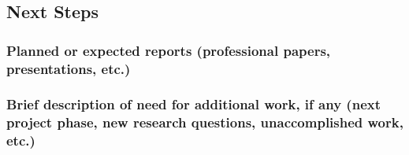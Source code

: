 \documentclass[letterpaper,12pt]{article}
\begin{document}
\subsection{Next Steps}
\subsubsection*{Planned or expected reports (professional papers, presentations, etc.)}
\subsubsection*{Brief description of need for additional work, if any (next project phase, new research questions, unaccomplished work, etc.)}












\end{document}
